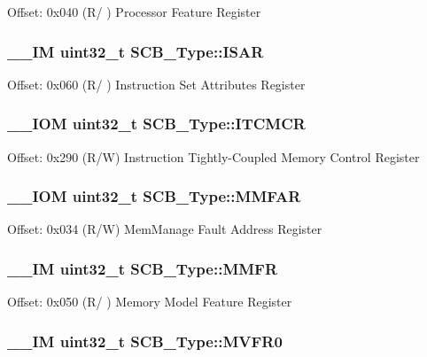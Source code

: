 Offset\-: 0x040 (R/ ) Processor Feature Register \hypertarget{struct_s_c_b___type_a00e93446b3433a807f1574fa2f1fce54}{
\subsubsection[{I\-S\-A\-R}]{\setlength{\rightskip}{0pt plus 5cm}\-\_\-\-\_\-\-I\-M uint32\-\_\-t S\-C\-B\-\_\-\-Type\-::\-I\-S\-A\-R}}\label{struct_s_c_b___type_a00e93446b3433a807f1574fa2f1fce54}
Offset\-: 0x060 (R/ ) Instruction Set Attributes Register \hypertarget{struct_s_c_b___type_aba8abbd3db06a07b50f56547501983f9}{
\subsubsection[{I\-T\-C\-M\-C\-R}]{\setlength{\rightskip}{0pt plus 5cm}\-\_\-\-\_\-\-I\-O\-M uint32\-\_\-t S\-C\-B\-\_\-\-Type\-::\-I\-T\-C\-M\-C\-R}}\label{struct_s_c_b___type_aba8abbd3db06a07b50f56547501983f9}
Offset\-: 0x290 (R/\-W) Instruction Tightly-\/\-Coupled Memory Control Register \hypertarget{struct_s_c_b___type_a2d03d0b7cec2254f39eb1c46c7445e80}{
\subsubsection[{M\-M\-F\-A\-R}]{\setlength{\rightskip}{0pt plus 5cm}\-\_\-\-\_\-\-I\-O\-M uint32\-\_\-t S\-C\-B\-\_\-\-Type\-::\-M\-M\-F\-A\-R}}\label{struct_s_c_b___type_a2d03d0b7cec2254f39eb1c46c7445e80}
Offset\-: 0x034 (R/\-W) Mem\-Manage Fault Address Register \hypertarget{struct_s_c_b___type_a4f353f207bb27a1cea7861aa9eb00dbb}{
\subsubsection[{M\-M\-F\-R}]{\setlength{\rightskip}{0pt plus 5cm}\-\_\-\-\_\-\-I\-M uint32\-\_\-t S\-C\-B\-\_\-\-Type\-::\-M\-M\-F\-R}}\label{struct_s_c_b___type_a4f353f207bb27a1cea7861aa9eb00dbb}
Offset\-: 0x050 (R/ ) Memory Model Feature Register \hypertarget{struct_s_c_b___type_a7a1ba0f875c0e97c1673882b1106e66b}{
\subsubsection[{M\-V\-F\-R0}]{\setlength{\rightskip}{0pt plus 5cm}\-\_\-\-\_\-\-I\-M uint32\-\_\-t S\-C\-B\-\_\-\-Type\-::\-M\-V\-F\-R0}}\label{struct_s_c_b___type_a7a1ba0f875c0e97c1673882b1106e66b}
